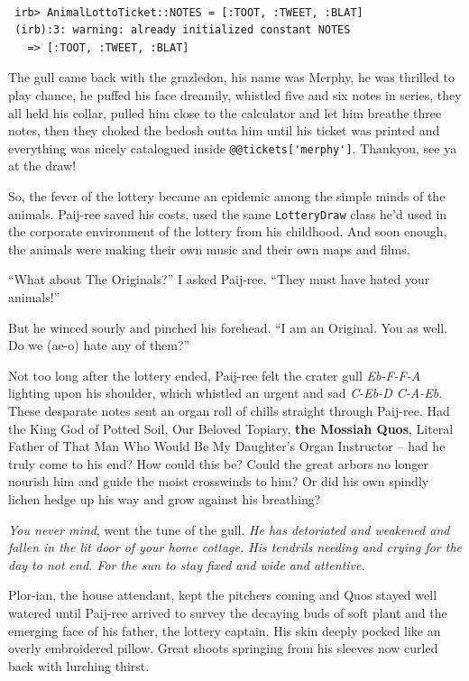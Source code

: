 \documentclass[10pt,twoside]{report}
\begin{document}
\begin{lstlisting}

 irb> AnimalLottoTicket::NOTES = [:TOOT, :TWEET, :BLAT]
 (irb):3: warning: already initialized constant NOTES
   => [:TOOT, :TWEET, :BLAT]

\end{lstlisting}


The gull came back with the grazledon, his name was Merphy, he was
thrilled to play chance, he puffed his face dreamily, whistled five
and six notes in series, they all held his collar, pulled him close to
the calculator and let him breathe three notes, then they choked the
bedosh outta him until his ticket was printed and everything was
nicely catalogued inside
\lstinline[breaklines=true]|@@tickets['merphy']|.  Thankyou, see ya at
the draw!

So, the fever of the lottery became an epidemic among the simple minds
of the animals.  Paij-ree saved his costs, used the same
\lstinline[breaklines=true]|LotteryDraw| class he'd used in the
corporate environment of the lottery from his childhood.  And soon
enough, the animals were making their own music and their own maps and
films.

``What about The Originals?'' I asked Paij-ree.  ``They must have
hated your animals!''

But he winced sourly and pinched his forehead.  ``I am an Original.
You as well. Do we (ae-o) hate any of them?''

Not too long after the lottery ended, Paij-ree felt the crater gull
{\em Eb-F-F-A} lighting upon his shoulder, which whistled an urgent
and sad {\em C-Eb-D C-A-Eb}. These desparate notes sent an organ roll
of chills straight through Paij-ree.  Had the King God of Potted Soil,
Our Beloved Topiary, {\bf the Mossiah Quos}, Literal Father of That
Man Who Would Be My Daughter's Organ Instructor -- had he truly come
to his end? How could this be?  Could the great arbors no longer
nourish him and guide the moist crosswinds to him?  Or did his own
spindly lichen hedge up his way and grow against his breathing?

{\em You never mind}, went the tune of the gull.  {\em He has
  detoriated and weakened and fallen in the lit door of your home
  cottage.  His tendrils needing and crying for the day to not
  end. For the sun to stay fixed and wide and attentive.}

Plor-ian, the house attendant, kept the pitchers coming and Quos
stayed well watered until Paij-ree arrived to survey the decaying buds
of soft plant and the emerging face of his father, the lottery
captain.  His skin deeply pocked like an overly embroidered
pillow. Great shoots springing from his sleeves now curled back with
lurching thirst.
\end{document}
